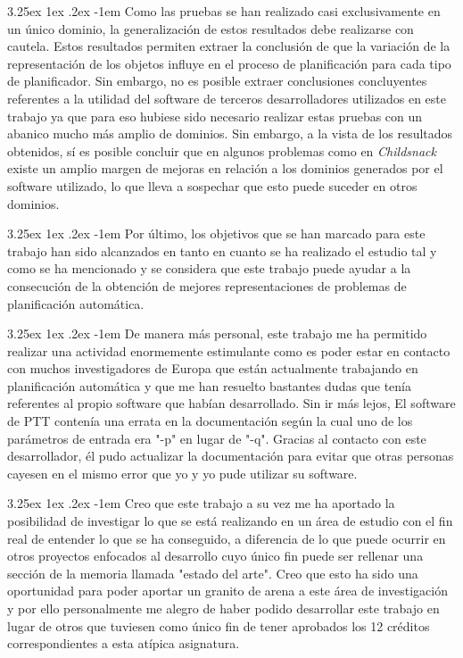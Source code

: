 \documentclass{article}
\makeatletter
\renewcommand\paragraph{\@startsection{paragraph}{5}{\z@}%
      {3.25ex \@plus1ex \@minus.2ex}%
      {-1em}%
      {\normalfont\normalsize\bfseries}}
\makeatother
\begin{document}
    \paragraph{}
    Como las pruebas se han realizado casi exclusivamente en un único dominio, la generalización de estos resultados debe realizarse con cautela. Estos resultados permiten extraer la conclusión de que la variación de la representación de los objetos influye en el proceso de planificación para cada tipo de planificador. Sin embargo, no es posible extraer conclusiones concluyentes referentes a la utilidad del software de terceros desarrolladores utilizados en este trabajo ya que para eso hubiese sido necesario realizar estas pruebas con un abanico mucho más amplio de dominios. Sin embargo, a la vista de los resultados obtenidos, sí es posible concluir que en algunos problemas como en \textit{Childsnack} existe un amplio margen de mejoras en relación a los dominios generados por el software utilizado, lo que lleva a sospechar que esto puede suceder en otros dominios.
    
    \paragraph{}
    Por último, los objetivos que se han marcado para este trabajo han sido alcanzados en tanto en cuanto se ha realizado el estudio tal y como se ha mencionado y se considera que este trabajo puede ayudar a la consecución de la obtención de mejores representaciones de problemas de planificación automática.
    
    \paragraph{}
    De manera más personal, este trabajo me ha permitido realizar una actividad enormemente estimulante como es poder estar en contacto con muchos investigadores de Europa que están actualmente trabajando en planificación automática y que me han resuelto bastantes dudas que tenía referentes al propio software que habían desarrollado. Sin ir más lejos, El software de PTT contenía una errata en la documentación según la cual uno de los parámetros de entrada era "-p" en lugar de "-q". Gracias al contacto con este desarrollador, él pudo actualizar la documentación para evitar que otras personas cayesen en el mismo error que yo y yo pude utilizar su software.
    
    \paragraph{}
    Creo que este trabajo a su vez me ha aportado la posibilidad de investigar lo que se está realizando en un área de estudio con el fin real de entender lo que se ha conseguido, a diferencia de lo que puede ocurrir en otros proyectos enfocados al desarrollo cuyo único fin puede ser rellenar una sección de la memoria llamada "estado del arte". Creo que esto ha sido una oportunidad para poder aportar un granito de arena a este área de investigación y por ello personalmente me alegro de haber podido desarrollar este trabajo en lugar de otros que tuviesen como único fin de tener aprobados los 12 créditos correspondientes a esta atípica asignatura.
    
\end{document}

